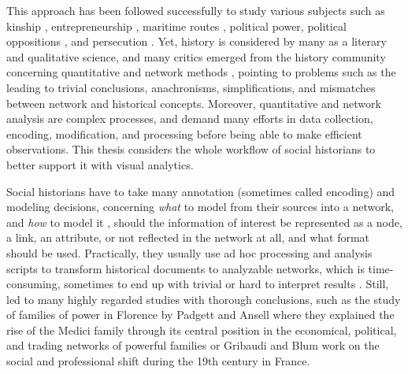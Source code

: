 This approach has been followed successfully to study various subjects such as kinship \cite{hambergerKinshipNetworkAnalysis2011}, entrepreneurship \cite{rubio-mondejarWomenEntrepreneursFamily2022}, maritime routes \cite{larsonThomasTartaronMaritime2014}, political power\cite{padgettRobustActionRise1993}, political oppositions \cite{osaSolidarityContentionNetworks2003}, and persecution \cite{mercklePeutonModeliserPersecution2018}.
Yet, history is considered by many as a literary and qualitative science, and many critics emerged from the history community concerning quantitative and network methods \cite{lepetitHistoireQuantitativeDeux1989, guldiHistoryManifesto2014, karila-cohenNouvellesCuisinesHistoire2018, lemercier12FormalNetwork2015}, pointing to problems such as the leading to trivial conclusions, anachronisms, simplifications, and mismatches between network and historical concepts.
Moreover, quantitative and network analysis are complex processes, and demand many efforts in data collection, encoding, modification, and processing before being able to make efficient observations.
This thesis considers the whole workflow of social historians to better support it with visual analytics.

Social historians have to take many annotation (sometimes called encoding) and modeling decisions, concerning \emph{what} to model from their sources into a network, and \emph{how} to model it \cite{cristofoliAuxSourcesGrands2008, dufournaudRechercheEmpiriqueHistoire2015}, \ie should the information of interest be represented as a node, a link, an attribute, or not reflected in the network at all, and what format should be used.
Practically, they usually use ad hoc processing and analysis scripts to transform historical documents to analyzable networks, which is time-consuming, sometimes to end up with trivial or hard to interpret results \cite{alkadi2022}.
Still, \hsna led to many highly regarded studies with thorough conclusions, such as the study of families of power in Florence by Padgett and Ansell where they explained the rise of the Medici family through its central position in the economical, political, and trading networks of powerful families\cite{padgettRobustActionRise1993} or Gribaudi and Blum work on the social and professional shift during the 19th century in France\cite{gribaudi1990}.

